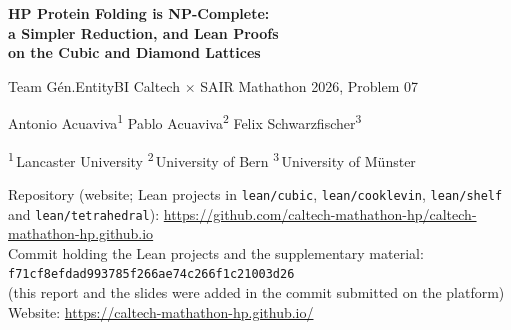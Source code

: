 \documentclass[11pt,letterpaper]{article}
\theoremstyle{definition}
\theoremstyle{remark}
\newcommand{\tetrapath}{lean/tetrahedral}
\begin{document}
\begin{center}
  {\LARGE\bfseries HP Protein Folding is NP-Complete:\\[2pt]
  a Simpler Reduction, and Lean Proofs\\[2pt] on the Cubic and Diamond Lattices\par}
  \vspace{8pt}
  {\large Team G\'en.EntityBI \;\textperiodcentered\; Caltech $\times$ SAIR Mathathon 2026, Problem 07\par}
  \vspace{8pt}
  Antonio Acuaviva\textsuperscript{1} \quad
  Pablo Acuaviva\textsuperscript{2} \quad
  Felix Schwarzfischer\textsuperscript{3}\par
  \vspace{4pt}
  {\small
  \textsuperscript{1}\,Lancaster University \quad
  \textsuperscript{2}\,University of Bern \quad
  \textsuperscript{3}\,University of M\"unster\par}
  \vspace{6pt}
  {\small
  Repository (website; Lean projects in \texttt{lean/cubic}, \texttt{lean/cooklevin},
  \texttt{lean/shelf} and \texttt{\tetrapath}):
  \url{https://github.com/caltech-mathathon-hp/caltech-mathathon-hp.github.io}\\
  Commit holding the Lean projects and the supplementary material:\\
  \texttt{f71cf8efdad993785f266ae74c266f1c21003d26}\\
  (this report and the slides were added in the commit submitted on the platform)\\
  Website: \url{https://caltech-mathathon-hp.github.io/}\par}
\end{center}
\end{document}
